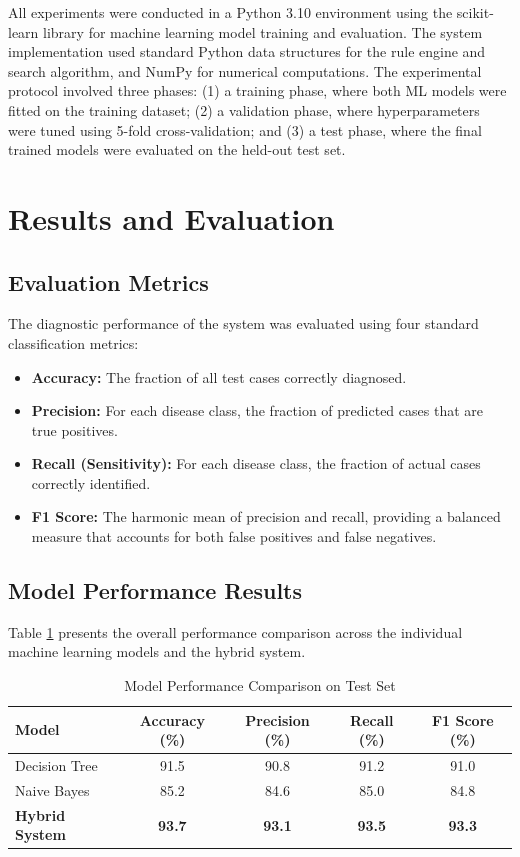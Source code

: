 \documentclass[12pt,a4paper]{article}
\begin{document}
All experiments were conducted in a Python 3.10 environment using the scikit-learn library \cite{sklearn} for machine learning model training and evaluation. The system implementation used standard Python data structures for the rule engine and search algorithm, and NumPy for numerical computations. The experimental protocol involved three phases: (1) a training phase, where both ML models were fitted on the training dataset; (2) a validation phase, where hyperparameters were tuned using 5-fold cross-validation; and (3) a test phase, where the final trained models were evaluated on the held-out test set.

\section{Results and Evaluation}

\subsection{Evaluation Metrics}

The diagnostic performance of the system was evaluated using four standard classification metrics:

\begin{itemize}[leftmargin=1.5cm]
    \item \textbf{Accuracy:} The fraction of all test cases correctly diagnosed.
    \item \textbf{Precision:} For each disease class, the fraction of predicted cases that are true positives.
    \item \textbf{Recall (Sensitivity):} For each disease class, the fraction of actual cases correctly identified.
    \item \textbf{F1 Score:} The harmonic mean of precision and recall, providing a balanced measure that accounts for both false positives and false negatives.
\end{itemize}

\subsection{Model Performance Results}

Table \ref{tab:performance} presents the overall performance comparison across the individual machine learning models and the hybrid system.

\begin{table}[H]
\centering
\caption{Model Performance Comparison on Test Set}
\label{tab:performance}
\begin{tabular}{lcccc}
\toprule
\textbf{Model} & \textbf{Accuracy (\%)} & \textbf{Precision (\%)} & \textbf{Recall (\%)} & \textbf{F1 Score (\%)} \\
\midrule
Decision Tree   & 91.5 & 90.8 & 91.2 & 91.0 \\
Naive Bayes     & 85.2 & 84.6 & 85.0 & 84.8 \\
\textbf{Hybrid System} & \textbf{93.7} & \textbf{93.1} & \textbf{93.5} & \textbf{93.3} \\
\bottomrule
\end{tabular}
\end{table}
\end{document}
